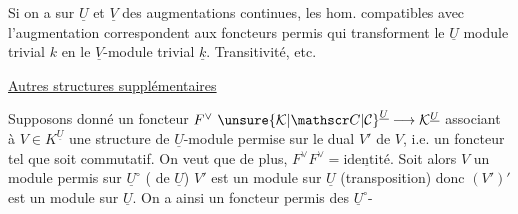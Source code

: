 Si on a sur $\underline U$ et $\underline V$ des augmentations continues,
les hom. compatibles avec l'augmentation
correspondent aux foncteurs permis qui transforment
le $\underline U$ module trivial  $k$ en le $\underline V$-module trivial $\underline k$.
Transitivité, etc.


\uline{Autres structures supplémentaires}

 Supposons donné un foncteur $F^\vee\ \unsure{\mathcal K|\mathscr C|\mathcal C}^{\underline U}\longrightarrow\mathcal K^{\underline U}$
associant à  $V\in K^{\underline U}$ une structure
de $\underline U$-module permise sur le dual $V'$ de $V$,
i.e. un foncteur tel que
soit commutatif. 
On veut que de plus,
$F^\vee F^\vee={}\underline{\text{identité}}$.  
 Soit alors $V$ un
 module permis sur $\underline U^\circ$
( de $\underline U$) $V'$ est un module sur
$\underline U$ (transposition) donc $(V')'$ est un
module sur $\underline U$. On a ainsi un
 foncteur permis des $\underline U^\circ$-

